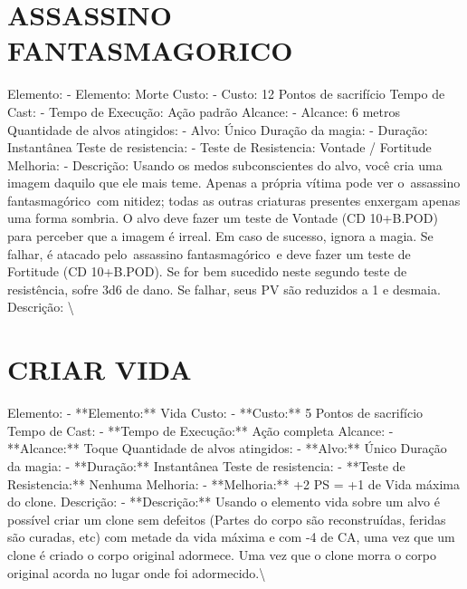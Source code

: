 \documentclass{article}%
\begin{document}
\section{ASSASSINO FANTASMAGORICO}%
\label{sec:ASSASSINOFANTASMAGORICO}%
Elemento: {-} Elemento: Morte\newline%
Custo: {-} Custo: 12 Pontos de sacrifício\newline%
Tempo de Cast: {-} Tempo de Execução: Ação padrão\newline%
Alcance: {-} Alcance: 6 metros\newline%
Quantidade de alvos atingidos: {-} Alvo: Único\newline%
Duração da magia: {-} Duração: Instantânea\newline%
Teste de resistencia: {-} Teste de Resistencia: Vontade / Fortitude\newline%
Melhoria: {-} Descrição: Usando os medos subconscientes do alvo, você cria uma imagem daquilo que ele mais teme. Apenas a própria vítima pode ver o~assassino fantasmagórico~com nitidez; todas as outras criaturas presentes enxergam apenas uma forma sombria. O alvo deve fazer um teste de Vontade (CD 10+B.POD) para perceber que a imagem é irreal. Em caso de sucesso, ignora a magia. Se falhar, é atacado pelo~assassino fantasmagórico~e deve fazer um teste de Fortitude (CD 10+B.POD). Se for bem sucedido neste segundo teste de resistência, sofre 3d6 de dano. Se falhar, seus PV são reduzidos a 1 e desmaia.\newline%
Descrição: \textbackslash{}

%
\section{CRIAR VIDA}%
\label{sec:CRIARVIDA}%
Elemento: {-} **Elemento:** Vida\newline%
Custo: {-} **Custo:** 5 Pontos de sacrifício\newline%
Tempo de Cast: {-} **Tempo de Execução:** Ação completa\newline%
Alcance: {-} **Alcance:** Toque\newline%
Quantidade de alvos atingidos: {-} **Alvo:** Único\newline%
Duração da magia: {-} **Duração:** Instantânea\newline%
Teste de resistencia: {-} **Teste de Resistencia:** Nenhuma\newline%
Melhoria: {-} **Melhoria:** +2 PS = +1 de Vida máxima do clone.\newline%
Descrição: {-} **Descrição:** Usando o elemento vida sobre um alvo é possível criar um clone sem defeitos (Partes do corpo são reconstruídas, feridas são curadas, etc) com metade da vida máxima e com {-}4 de CA, uma vez que um clone é criado o corpo original adormece. Uma vez que o clone morra o corpo original acorda no lugar onde foi adormecido.\textbackslash{}
\end{document}
